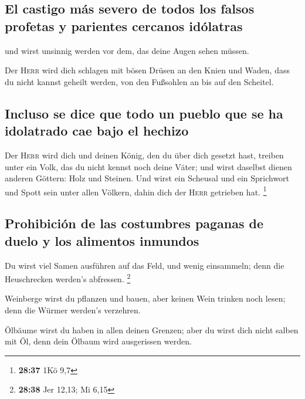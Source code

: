 \hypertarget{el-castigo-muxe1s-severo-de-todos-los-falsos-profetas-y-parientes-cercanos-iduxf3latras}{%
\subsection{El castigo más severo de todos los falsos profetas y
parientes cercanos
idólatras}\label{el-castigo-muxe1s-severo-de-todos-los-falsos-profetas-y-parientes-cercanos-iduxf3latras}}

 und wirst unsinnig werden vor dem, das deine Augen sehen
müssen.

 Der \textsc{Herr} wird dich schlagen mit bösen Drüsen an
den Knien und Waden, dass du nicht kannst geheilt werden, von den
Fußsohlen an bis auf den Scheitel.

\hypertarget{incluso-se-dice-que-todo-un-pueblo-que-se-ha-idolatrado-cae-bajo-el-hechizo}{%
\subsection{Incluso se dice que todo un pueblo que se ha idolatrado cae
bajo el
hechizo}\label{incluso-se-dice-que-todo-un-pueblo-que-se-ha-idolatrado-cae-bajo-el-hechizo}}

 Der \textsc{Herr} wird dich und deinen König, den du
über dich gesetzt hast, treiben unter ein Volk, das du nicht kennst noch
deine Väter; und wirst daselbst dienen anderen Göttern: Holz und
Steinen.  Und wirst ein Scheusal und ein Sprichwort und
Spott sein unter allen Völkern, dahin dich der \textsc{Herr} getrieben
hat. \footnote{\textbf{28:37} 1Kö 9,7}

\hypertarget{prohibiciuxf3n-de-las-costumbres-paganas-de-duelo-y-los-alimentos-inmundos}{%
\subsection{Prohibición de las costumbres paganas de duelo y los
alimentos
inmundos}\label{prohibiciuxf3n-de-las-costumbres-paganas-de-duelo-y-los-alimentos-inmundos}}

 Du wirst viel Samen ausführen auf das Feld, und wenig
einsammeln; denn die Heuschrecken werden's abfressen. \footnote{\textbf{28:38}
  Jer 12,13; Mi 6,15}

 Weinberge wirst du pflanzen und bauen, aber keinen Wein
trinken noch lesen; denn die Würmer werden's verzehren.

 Ölbäume wirst du haben in allen deinen Grenzen; aber du
wirst dich nicht salben mit Öl, denn dein Ölbaum wird ausgerissen
werden.

